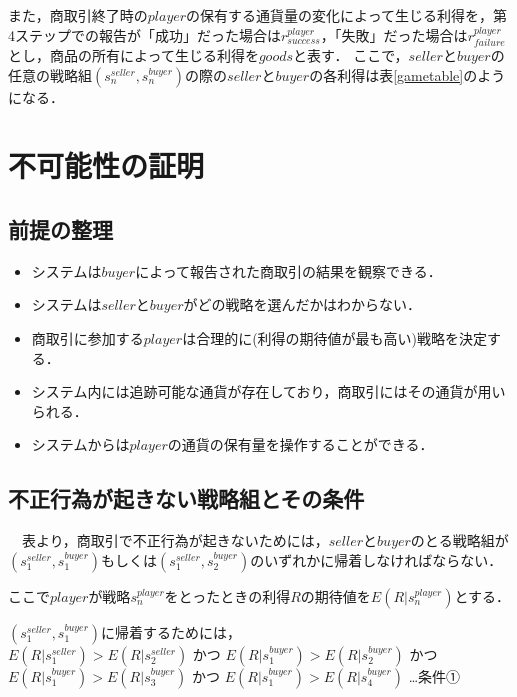 \documentclass[twocolumn, a4j]{article}
\begin{document}
また，商取引終了時の$ player$の保有する通貨量の変化によって生じる利得を，第4ステップでの報告が「成功」だった場合は$ r^{player}_{success}$，「失敗」だった場合は$ r^{player}_{failure}$とし，商品の所有によって生じる利得を$ goods$と表す．
ここで，$ seller$と$ buyer$の任意の戦略組$ (s^{seller}_n, s^{buyer}_n)$の際の$ seller$と$ buyer$の各利得は表\ref{gametable}のようになる．

\onecolumn
\section{不可能性の証明}
\subsection{前提の整理}
\begin{itemize}
  \item システムは$buyer$によって報告された商取引の結果を観察できる．
  \vspace{-12mm}
  \item システムは$seller$と$buyer$がどの戦略を選んだかはわからない．
  \vspace{-12mm}
	\item 商取引に参加する$player$は合理的に(利得の期待値が最も高い)戦略を決定する．
  \vspace{-12mm}
	\item システム内には追跡可能な通貨が存在しており，商取引にはその通貨が用いられる．
  \vspace{-12mm}
	\item システムからは$player$の通貨の保有量を操作することができる．
  \vspace{-12mm}
\end{itemize}

\subsection{不正行為が起きない戦略組とその条件}
　表より，商取引で不正行為が起きないためには，$seller$と$buyer$のとる戦略組が$ (s^{seller}_1, s^{buyer}_1)$もしくは$(s^{seller}_1, s^{buyer}_2)$のいずれかに帰着しなければならない．

ここで$player$が戦略$s^{player}_n$をとったときの利得$R$の期待値を$E(R|s^{player}_n)$とする．

$(s^{seller}_1, s^{buyer}_1)$に帰着するためには，\\

$E(R|s^{seller}_1)>E(R|s^{seller}_2)$
かつ
$E(R|s^{buyer}_1)>E(R|s^{buyer}_2)$
かつ
$E(R|s^{buyer}_1)>E(R|s^{buyer}_3)$
かつ
$E(R|s^{buyer}_1)>E(R|s^{buyer}_4)$ …条件①\\
\end{document}
